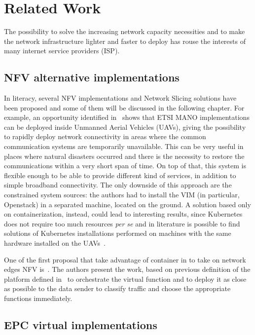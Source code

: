 \chapter{Related Work}
\label{chap:rel_wk}


The possibility to solve the increasing network capacity necessities and to make
the network infrastructure lighter and faster to deploy has rouse the interests
of many internet service providers (ISP).

\section{NFV alternative implementations}

In literacy, several NFV implementations and Network Slicing solutions have been
proposed and some of them will be discussed in the following chapter. For
example, an opportunity identified in~\cite{nogales2018nfv} shows that ETSI MANO
implementations can be deployed inside Unmanned Aerial Vehicles (UAVs), giving
the possibility to rapidly deploy network connectivity in areas where the common
communication systems are temporarily unavailable. This can be very useful in
places where natural disasters occurred and there is the necessity to restore
the communications within a very short span of time. On top of that, this system
is flexible enough to be able to provide different kind of services, in addition
to simple broadband connectivity. The only downside of this approach are the
constrained system sources: the authors had to install the VIM (in particular,
Openstack) in a separated machine, located on the ground. A solution based only
on containerization, instead, could lead to interesting results, since
Kubernetes does not require too much resources \textit{per se} and in literature
is possible to find solutions of Kubernetes installations performed on machines
with the same hardware installed on the UAVs~\cite{pahl2016container}.

One of the first proposal that take advantage of container in to take on network
edges NFV is~\cite{cziva2017container}. The authors present the work, based on
previous definition of the platform defined in~\cite{cziva2015container} to
orchestrate the virtual function and to deploy it as close as possible to the
data sender to classify traffic and choose the appropriate functions
immediately.

\section{EPC virtual implementations}

